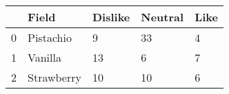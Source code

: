 \begin{tabular}{lllll}
\toprule
{} &       Field & Dislike & Neutral & Like \\
\midrule
0 &   Pistachio &       9 &      33 &    4 \\
1 &     Vanilla &      13 &       6 &    7 \\
2 &  Strawberry &      10 &      10 &    6 \\
\bottomrule
\end{tabular}
